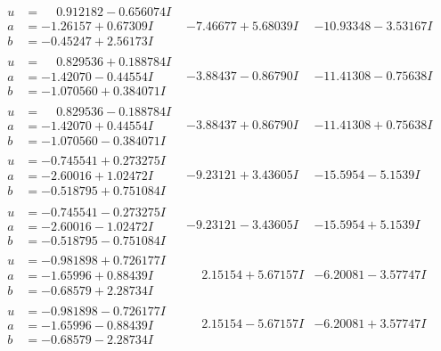 \documentclass[1p]{elsarticle_modified}
\theoremstyle{definition}
\begin{document}
$$\begin{array}{c|c|c}
\begin{aligned}
u &= \phantom{-}0.912182 - 0.656074 I \\
a &= -1.26157 + 0.67309 I \\
b &= -0.45247 + 2.56173 I\end{aligned}
 & -7.46677 + 5.68039 I & -10.93348 - 3.53167 I \\ \hline\begin{aligned}
u &= \phantom{-}0.829536 + 0.188784 I \\
a &= -1.42070 - 0.44554 I \\
b &= -1.070560 + 0.384071 I\end{aligned}
 & -3.88437 - 0.86790 I & -11.41308 - 0.75638 I \\ \hline\begin{aligned}
u &= \phantom{-}0.829536 - 0.188784 I \\
a &= -1.42070 + 0.44554 I \\
b &= -1.070560 - 0.384071 I\end{aligned}
 & -3.88437 + 0.86790 I & -11.41308 + 0.75638 I \\ \hline\begin{aligned}
u &= -0.745541 + 0.273275 I \\
a &= -2.60016 + 1.02472 I \\
b &= -0.518795 + 0.751084 I\end{aligned}
 & -9.23121 + 3.43605 I & -15.5954 - 5.1539 I \\ \hline\begin{aligned}
u &= -0.745541 - 0.273275 I \\
a &= -2.60016 - 1.02472 I \\
b &= -0.518795 - 0.751084 I\end{aligned}
 & -9.23121 - 3.43605 I & -15.5954 + 5.1539 I \\ \hline\begin{aligned}
u &= -0.981898 + 0.726177 I \\
a &= -1.65996 + 0.88439 I \\
b &= -0.68579 + 2.28734 I\end{aligned}
 & \phantom{-}2.15154 + 5.67157 I & -6.20081 - 3.57747 I \\ \hline\begin{aligned}
u &= -0.981898 - 0.726177 I \\
a &= -1.65996 - 0.88439 I \\
b &= -0.68579 - 2.28734 I\end{aligned}
 & \phantom{-}2.15154 - 5.67157 I & -6.20081 + 3.57747 I \\ \hline\begin{aligned}

\end{aligned}
\end{array}$$
\end{document}
